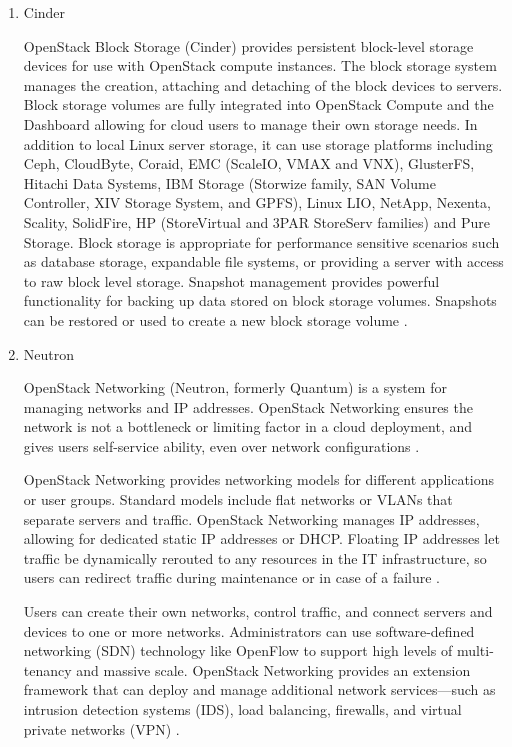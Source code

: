 \begin{enumerate}
        \item Cinder
        \par
        OpenStack Block Storage (Cinder) provides persistent block-level storage devices for use with OpenStack compute instances. The block storage system manages the creation, attaching and detaching of the block devices to servers. Block storage volumes are fully integrated into OpenStack Compute and the Dashboard allowing for cloud users to manage their own storage needs. In addition to local Linux server storage, it can use storage platforms including Ceph, CloudByte, Coraid, EMC (ScaleIO, VMAX and VNX), GlusterFS, Hitachi Data Systems, IBM Storage (Storwize family, SAN Volume Controller, XIV Storage System, and GPFS), Linux LIO, NetApp, Nexenta, Scality, SolidFire, HP (StoreVirtual and 3PAR StoreServ families) and Pure Storage. Block storage is appropriate for performance sensitive scenarios such as database storage, expandable file systems, or providing a server with access to raw block level storage. Snapshot management provides powerful functionality for backing up data stored on block storage volumes. Snapshots can be restored or used to create a new block storage volume \cite{openstack}\cite{wiki}.
        \item Neutron
        \par
        OpenStack Networking (Neutron, formerly Quantum) is a system for managing networks and IP addresses. OpenStack Networking ensures the network is not a bottleneck or limiting factor in a cloud deployment, and gives users self-service ability, even over network configurations \cite{openstack}\cite{wiki}.
        \par
        OpenStack Networking provides networking models for different applications or user groups. Standard models include flat networks or VLANs that separate servers and traffic. OpenStack Networking manages IP addresses, allowing for dedicated static IP addresses or DHCP. Floating IP addresses let traffic be dynamically rerouted to any resources in the IT infrastructure, so users can redirect traffic during maintenance or in case of a failure \cite{wiki}.
        \par
        Users can create their own networks, control traffic, and connect servers and devices to one or more networks. Administrators can use software-defined networking (SDN) technology like OpenFlow to support high levels of multi-tenancy and massive scale. OpenStack Networking provides an extension framework that can deploy and manage additional network services—such as intrusion detection systems (IDS), load balancing, firewalls, and virtual private networks (VPN) \cite{openstack}\cite{wiki}.

\end{enumerate}
